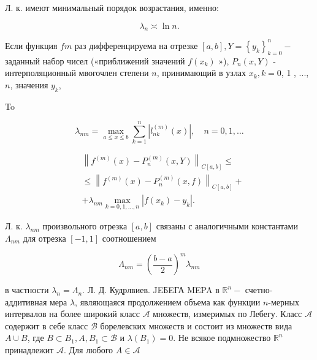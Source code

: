 \documentclass[10pt]{article}
\begin{document}
Л. к. имеют минимальный порядок возрастания, именно:



\[

\lambda_{n} \asymp \ln n .

\]



Если функция $f m$ раз дифференцируема на отрезке $[a, b], Y=\left\{y_{k}\right\}_{k=0}^{n}-$ заданный набор чисел («приближений значений $f\left(x_{k}\right)$ »), $P_{n}(x, Y)$ - интерполяционный мвогочлен степени $n$, принимающий в узлах $x_{k}, k=0$, 1 , ..., $n$, значения $y_{k}$,



To



\[

\lambda_{n m}=\max _{a \leqslant x \leqslant b} \sum_{k=1}^{n}\left|l_{n k}^{(m)}(x)\right|, \quad n=0,1, \ldots

\]



\[

\begin{aligned}

& \left\|f^{(m)}(x)-P_{n}^{(m)}(x, Y)\right\|_{C[a, b]} \leqslant \\

& \leqslant\left\|f^{(m)}(x)-P_{n}^{(m)}(x, f)\right\|_{C[a, b]}+ \\

& +\lambda_{n m} \max _{k=0,1, \ldots, n}\left|f\left(x_{k}\right)-y_{k}\right| .

\end{aligned}

\]



Л. к. $\lambda_{n m}$ произвольного отрезка $[a, b]$ связаны с аналогичными константами $\Lambda_{n m}$ для отрезка $[-1,1]$ соотношением



\[

\Lambda_{n m}=\left(\frac{b-a}{2}\right)^{m} \lambda_{n m}

\]



в частности $\lambda_{n}=\Lambda_{n}$. Л. Д. Кудрлвиев. JEБEГА MEPA в $\mathbb{R}^{n}-$ счетно-аддитивная мера $\lambda$, являющаяся продолжением объема как функции $n$-мерных интервалов на более широкий класс $\mathcal{A}$ множеств, измеримых по Лебегу. Класс $\mathcal{A}$ содержит в себе класс $\mathscr{B}$ борелевских множеств и состоит из множеств вида $A \cup B$, где $B \subset B_{1}, A, B_{1} \subset \mathscr{B}$ и $\lambda\left(B_{1}\right)=0$. Не всякое подмножество $\mathbb{R}^{n}$ принадлежит $\mathcal{A}$. Для любого $A \in \mathcal{A}$
\end{document}
